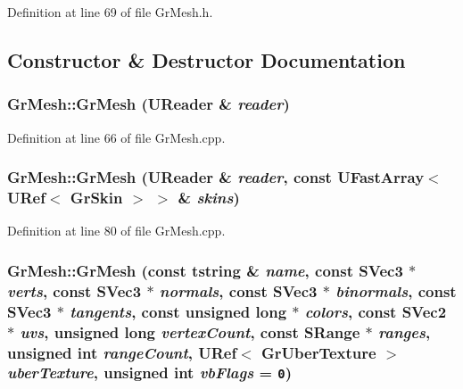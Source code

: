 Definition at line 69 of file GrMesh.h.

\subsection{Constructor \& Destructor Documentation}
\hypertarget{class_gr_mesh_da12f2c59e9315aad65efd9f856e0d16}{
\subsubsection[{GrMesh}]{\setlength{\rightskip}{0pt plus 5cm}GrMesh::GrMesh ({\bf UReader} \& {\em reader})}}
\label{class_gr_mesh_da12f2c59e9315aad65efd9f856e0d16}




Definition at line 66 of file GrMesh.cpp.\hypertarget{class_gr_mesh_81af8af4ed876aa87e65bab52a19f714}{
\subsubsection[{GrMesh}]{\setlength{\rightskip}{0pt plus 5cm}GrMesh::GrMesh ({\bf UReader} \& {\em reader}, \/  const {\bf UFastArray}$<$ {\bf URef}$<$ {\bf GrSkin} $>$ $>$ \& {\em skins})}}
\label{class_gr_mesh_81af8af4ed876aa87e65bab52a19f714}




Definition at line 80 of file GrMesh.cpp.\hypertarget{class_gr_mesh_2b1dc3fccc2037163884b7d436da63a5}{
\subsubsection[{GrMesh}]{\setlength{\rightskip}{0pt plus 5cm}GrMesh::GrMesh (const {\bf tstring} \& {\em name}, \/  const {\bf SVec3} $\ast$ {\em verts}, \/  const {\bf SVec3} $\ast$ {\em normals}, \/  const {\bf SVec3} $\ast$ {\em binormals}, \/  const {\bf SVec3} $\ast$ {\em tangents}, \/  const unsigned long $\ast$ {\em colors}, \/  const {\bf SVec2} $\ast$ {\em uvs}, \/  unsigned long {\em vertexCount}, \/  const {\bf SRange} $\ast$ {\em ranges}, \/  unsigned int {\em rangeCount}, \/  {\bf URef}$<$ {\bf GrUberTexture} $>$ {\em uberTexture}, \/  unsigned int {\em vbFlags} = {\tt 0})}}
\label{class_gr_mesh_2b1dc3fccc2037163884b7d436da63a5}





